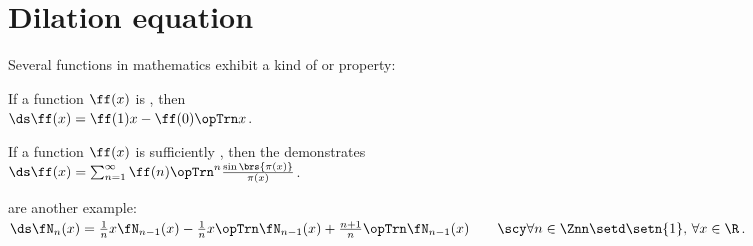
\section{Dilation equation}
Several functions in mathematics exhibit a kind of  or  property:
\begin{listi}
  \item If a function $\ff(x)$ is , then 
        \\\indentx$\ds\ff(x) = \ff(1)x - \ff(0)\opTrn x$.   %
  \item If a function $\ff(x)$ is sufficiently , then the   demonstrates
        \\\indentx$\ds\ff(x) = \sum_{n=1}^\infty \ff(n) \opTrn^n\frac{\sin\brs{\pi(x)}}{\pi(x)}$.
  \item {}  are another example:
        \\\indentx$\ds\fN_n(x)   = \frac{1}{n}x\fN_{n-1}(x) - \frac{1}{n}x\opTrn\fN_{n-1}(x) + \frac{n+1}{n}\opTrn\fN_{n-1}(x)  \qquad\scy\forall n\in\Znn\setd\setn{1},\,  \forall x\in\R$.
\end{listi}

